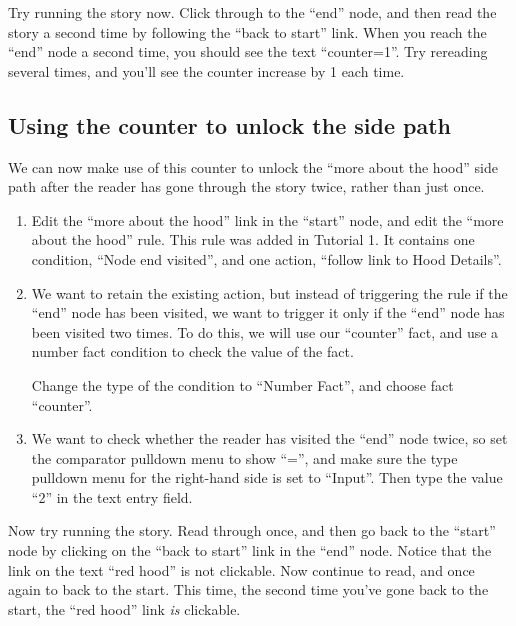 \documentclass{article}
\begin{document}
Try running the story now. Click through to the ``end'' node, and 
then read the story a second time by following the ``back to start'' 
link. When you reach the ``end'' node a second time, you should see 
the text ``counter=1''. Try rereading several times, and you'll see 
the counter increase by 1 each time.

\subsection{Using the counter to unlock the side path}

We can now make use of this counter to unlock the ``more about the 
hood'' side path after the reader has gone through the story twice, 
rather than just once.

\begin{enumerate}
    \item Edit the ``more about the hood'' link in the ``start'' 
    node, and edit the ``more about the hood'' rule. This rule was 
    added in Tutorial 1. It contains one condition, ``Node end 
    visited'', and one action, ``follow link to Hood Details''. 
    \item We 
    want to retain the existing action, but instead of triggering the 
    rule if the ``end'' node has been visited, we want to trigger it 
    only if the ``end'' node has been visited two times.
    To do this, we will use our ``counter'' fact, and use a number 
    fact condition to check the value of the fact. 
    
    Change the type of 
    the condition to ``Number Fact'', and choose fact ``counter''.
    \item We want to check whether the reader has visited the ``end'' 
    node twice, so set the comparator pulldown menu to show ``='', 
    and make sure the type pulldown menu for the right-hand side is 
    set to ``Input''. Then type the value ``2'' in the text entry field.
\end{enumerate}

\noindent Now try running the story. Read through once, and then go back to the 
``start'' node by clicking on the ``back to start'' link in the 
``end'' node. Notice that the link on the text ``red hood'' is not 
clickable. Now continue to read, and once again to back to the start. 
This time, the second time you've gone back to the start, the ``red 
hood'' link \textit{is} clickable.
\end{document}

